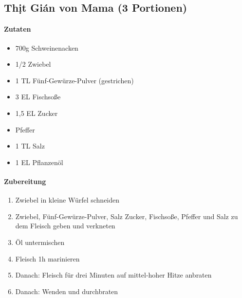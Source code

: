 \newpage
{}
\subsection{Thịt Gián von Mama (3 Portionen)}
\paragraph{Zutaten}
\begin{itemize}[noitemsep]
	\item 700g Schweinenacken
	\item 1/2 Zwiebel
	\item 1 TL Fünf-Gewürze-Pulver (gestrichen)
	\item 3 EL Fischsoße
	\item 1,5 EL Zucker
	\item Pfeffer
	\item 1 TL Salz
	\item 1 EL Pflanzenöl
\end{itemize}
\paragraph{Zubereitung}
\begin{enumerate}[noitemsep]
	\item Zwiebel in kleine Würfel schneiden
	\item Zwiebel, Fünf-Gewürze-Pulver, Salz Zucker, Fischsoße, Pfeffer und Salz zu dem Fleisch geben und verkneten
	\item Öl untermischen
	\item Fleisch 1h marinieren
	\item Danach: Fleisch für drei Minuten auf mittel-hoher Hitze anbraten
	\item Danach: Wenden und durchbraten
\end{enumerate}
